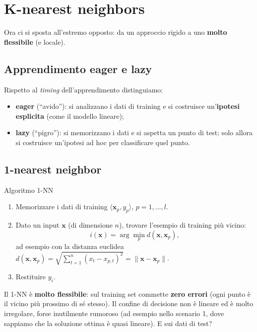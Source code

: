 \section{K-nearest neighbors}\label{k-nearest-neighbors}

Ora ci si sposta all'estremo opposto: da un approccio rigido a uno
\textbf{molto flessibile} (e locale).

\subsection{Apprendimento eager e
lazy}\label{apprendimento-eager-e-lazy}

Rispetto al \emph{timing} dell'apprendimento distinguiamo:

\begin{itemize}
\tightlist
\item
  \textbf{eager} (``avido''): si analizzano i dati di training e si
  costruisce un'\textbf{ipotesi esplicita} (come il modello lineare);
\item
  \textbf{lazy} (``pigro''): si memorizzano i dati e si aspetta un punto
  di test; solo allora si costruisce un'ipotesi ad hoc per classificare
  quel punto.
\end{itemize}

\subsection{1-nearest neighbor}\label{nearest-neighbor}

\begin{boxdefinition}{Algoritmo 1-NN}

\begin{enumerate}
\def\labelenumi{\arabic{enumi}.}
\tightlist
\item
  Memorizzare i dati di training \(\langle \mathbf{x}_p, y_p\rangle\),
  \(p = 1,\dots,l\).
\item
  Dato un input \(\mathbf{x}\) (di dimensione \(n\)), trovare l'esempio
  di training più vicino: \[
  i(\mathbf{x}) = \arg\min_p d(\mathbf{x}, \mathbf{x}_p),
  \] ad esempio con la distanza euclidea
  \(d(\mathbf{x}, \mathbf{x}_p) = \sqrt{\sum_{t=1}^{n}(x_t - x_{p,t})^2} = \|\mathbf{x} - \mathbf{x}_p\|\).
\item
  Restituire \(y_i\).
\end{enumerate}

\end{boxdefinition}

Il 1-NN è \textbf{molto flessibile}: sul training set commette
\textbf{zero errori} (ogni punto è il vicino più prossimo di sé stesso).
Il confine di decisione non è lineare ed è molto irregolare, forse
inutilmente rumoroso (ad esempio nello scenario 1, dove sappiamo che la
soluzione ottima è quasi lineare). E sui dati di test?

